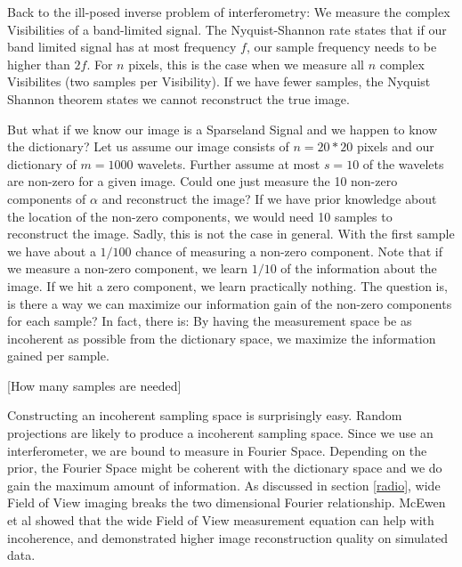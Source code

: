 
Back to the ill-posed inverse problem of interferometry: We measure the complex Visibilities of a band-limited signal. The Nyquist-Shannon rate states that if our band limited signal has at most frequency $f$, our sample frequency needs to be higher than $2f$. For $n$ pixels, this is the case when we measure all $n$ complex Visibilites (two samples per Visibility). If we have fewer samples, the Nyquist Shannon theorem states we cannot reconstruct the true image.

But what if we know our image is a Sparseland Signal and we happen to know the dictionary? Let us assume our image consists of $n = 20*20$ pixels and our dictionary of $m = 1000$ wavelets. Further assume at most $s=10$ of the wavelets are non-zero for a given image. Could one just measure the 10 non-zero components of $\alpha$ and reconstruct the image? If we have prior knowledge about the location of the non-zero components, we would need 10 samples to reconstruct the image. Sadly, this is not the case in general. With the first sample we have about a $1/100$ chance of measuring a non-zero component. Note that if we measure a non-zero component, we learn $1/10$ of the information about the image. If we hit a zero component, we learn practically nothing. The question is, is there a way we can maximize our information gain of the non-zero components for each sample? In fact, there is: By having the measurement space be  as incoherent as possible from the dictionary space, we maximize the information gained per sample.

[How many samples are needed]

Constructing an incoherent sampling space is surprisingly easy. Random projections are likely to produce a incoherent sampling space. Since we use an interferometer, we are bound to measure in Fourier Space. Depending on the prior, the Fourier Space might be coherent with the dictionary space and we do gain the maximum amount of information. As discussed in section \ref{radio}, wide Field of View imaging breaks the two dimensional Fourier relationship. McEwen et al\cite{mcewen2011compressed} showed that the wide Field of View measurement equation can help with incoherence, and demonstrated higher image reconstruction quality on simulated data.

